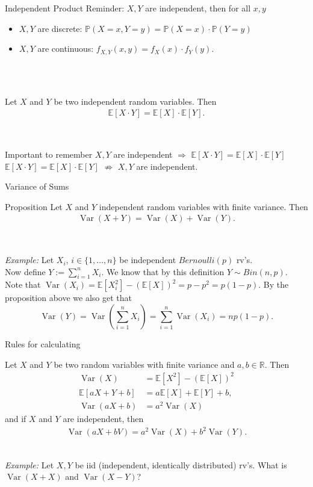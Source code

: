 \documentclass[11pt,pdf,ngerman,UKenglish]{beamer}%
\newcommand{\IR}{\mathds{R}}
\newcommand{\IP}{\mathbb{P}}
\newcommand{\IE}{{\mathbb{E}}}
\newcommand{\1}{\mathbb{1}}
\newcommand{\Var}{\operatorname{Var}}
\theoremstyle{thm}
\theoremstyle{def}
\begin{document}
\begin{frame}{Independent Product}
Reminder: $X,Y$ are independent, then for all $x,y$
\begin{itemize}
\item $X,Y$ are discrete: $\IP(X=x,Y=y) = \IP(X=x) \cdot \IP(Y=y)$%
\item $X,Y$ are continuous: $f_{X,Y}(x,y) = f_X(x) \cdot f_Y(y)$.
\end{itemize}
\ \\ \
\begin{lemma}
Let $X$ and $Y$ be two independent random variables. Then
\begin{align*}
\IE [ X \cdot Y ] = \IE[X] \cdot \IE [ Y ].
\end{align*}
\end{lemma}
\
\pause
\begin{block}{Important to remember}
$X,Y$ are independent $\Rightarrow$ $\IE [ X \cdot Y ] = \IE[X] \cdot \IE [ Y ]$
\\ \vspace*{1mm}
$\IE [ X \cdot Y ] = \IE[X] \cdot \IE [ Y ]$ $\nRightarrow$ $X,Y$ are independent.
\end{block}
\vfill
\end{frame}


\begin{frame}{Variance of Sums}
\begin{block}{Proposition}
Let $X$ and $Y$ independent random variables with finite variance. Then
\begin{align*}
\Var(X+Y) = \Var(X) + \Var(Y).
\end{align*}
\end{block}
\
\pause

\textit{Example:} Let $X_i$, $i\in \{1,\ldots,n\}$ be independent $Bernoulli(p)$ rv's.
\\ Now define $Y:= \sum_{i=1}^n X_i$. We know that by this definition $Y \sim Bin(n,p)$. 
\\ \pause Note that $\Var(X_i) = \IE[ X_i^2] - (\IE[X])^2 = p - p^2 = p(1-p)$. By the proposition above we also get that 
$$\Var(Y) = \Var \left( \sum_{i=1}^n X_i \right) = \sum_{i=1}^n \Var(X_i) = n p (1-p).$$
\end{frame}


\begin{frame}{Rules for calculating}
\begin{block}{}
Let $X$ and $Y$ be two random variables with finite variance and $a,b \in \IR$. Then
\begin{align*}
\Var(X) &= \IE[X^2] - (\IE[X])^2
\\
\IE[ a X + Y + b] &= a \IE[X] + \IE[Y] + b,
\\
\Var( a X + b) &= a^2 \Var(X)
\end{align*}
and if $X$ and $Y$ are independent, then
\begin{align*}
\Var(aX + bV)= a^2 \Var(X) + b^2 \Var(Y).
\end{align*}
\end{block}
\ \\
\pause
\textit{Example:} Let $X,Y$ be iid (independent, identically distributed) rv's. What is $\Var(X + X)$ and $\Var(X-Y)$?
\end{frame}
\end{document}
